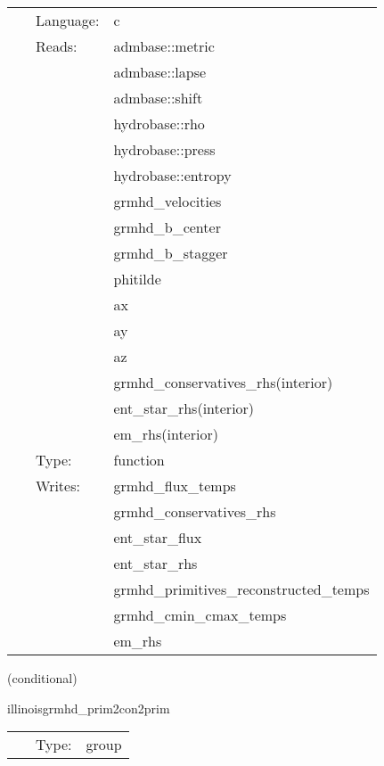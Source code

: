  \begin{tabular*}{160mm}{cll} 
~ & Language:  & c \\ 
~ & Reads:  & admbase::metric \\ 
~& ~ &admbase::lapse\\ 
~& ~ &admbase::shift\\ 
~& ~ &hydrobase::rho\\ 
~& ~ &hydrobase::press\\ 
~& ~ &hydrobase::entropy\\ 
~& ~ &grmhd\_velocities\\ 
~& ~ &grmhd\_b\_center\\ 
~& ~ &grmhd\_b\_stagger\\ 
~& ~ &phitilde\\ 
~& ~ &ax\\ 
~& ~ &ay\\ 
~& ~ &az\\ 
~& ~ &grmhd\_conservatives\_rhs(interior)\\ 
~& ~ &ent\_star\_rhs(interior)\\ 
~& ~ &em\_rhs(interior)\\ 
~ & Type:  & function \\ 
~ & Writes:  & grmhd\_flux\_temps \\ 
~& ~ &grmhd\_conservatives\_rhs\\ 
~& ~ &ent\_star\_flux\\ 
~& ~ &ent\_star\_rhs\\ 
~& ~ &grmhd\_primitives\_reconstructed\_temps\\ 
~& ~ &grmhd\_cmin\_cmax\_temps\\ 
~& ~ &em\_rhs\\ 
\end{tabular*} 


\vspace{5mm}

   (conditional) 

\hspace{5mm} illinoisgrmhd\_prim2con2prim 

\hspace{5mm}{\it convert hydrobase initial data to illinoisgrmhd variables } 


\hspace{5mm}

 \begin{tabular*}{160mm}{cll} 
~ & Type:  & group \\ 
\end{tabular*} 


